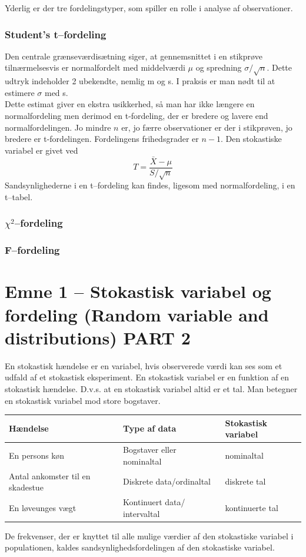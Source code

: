 \documentclass[11pt]{article}
\begin{document}
Yderlig er der tre fordelingstyper, som spiller en rolle i analyse af observationer.
\subsubsection{Student's t--fordeling}
Den centrale grænseværdisætning siger, at gennemsnittet i en stikprøve tilnærmelsesvis er normalfordelt med middelværdi $\mu$ og spredning $\sigma/\sqrt{n}$. Dette udtryk indeholder 2 ubekendte, nemlig m og s. I praksis er man nødt til at estimere $\sigma$ med s.\\[0.2cm]
Dette estimat giver en ekstra usikkerhed, så man har ikke længere en normalfordeling men derimod en t-fordeling, der er bredere og lavere end normalfordelingen. Jo mindre $n$ er, jo færre observationer er der i stikprøven, jo bredere er t-fordelingen. Fordelingens frihedsgrader er $n-1$. Den stokastiske variabel er givet ved
$$T=\frac{\bar{X}-\mu}{S/\sqrt{n}}$$
Sandsynlighederne i en t--fordeling kan findes, ligesom med normalfordeling, i en t--tabel. 

\subsubsection{$\chi^2$--fordeling}

\subsubsection{F--fordeling}

\newpage

\section{Emne 1 -- Stokastisk variabel og fordeling (Random variable and distributions) PART 2}
En stokastisk hændelse er en variabel, hvis observerede værdi kan ses som et udfald af et stokastisk eksperiment. En stokastisk variabel er en funktion af en stokastisk hændelse. D.v.s. at en stokastisk variabel altid er et tal. Man betegner en stokastisk variabel mod store bogstaver.
\begin{table}[H]
\centering
\begin{tabular}{lll}
\textbf{Hændelse}                & \textbf{Type af data}        & \textbf{Stokastisk variabel} \\ \hline
En persons køn                   & Bogstaver eller nominaltal   & nominaltal                   \\
Antal ankomster til en skadestue & Diskrete data/ordinaltal     & diskrete tal                 \\
En løveunges vægt                & Kontinuert data/ intervaltal & kontinuerte tal             
\end{tabular}
\end{table}
De frekvenser, der er knyttet til alle mulige værdier af den stokastiske variabel i populationen, kaldes sandsynlighedsfordelingen af den stokastiske variabel.
\end{document}
